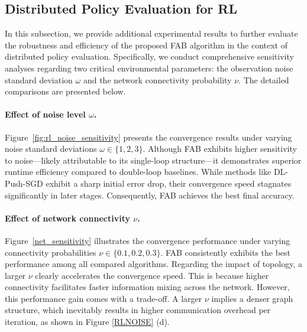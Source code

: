 \documentclass{article}
\theoremstyle{plain}
\theoremstyle{definition}
\theoremstyle{remark}
\begin{document}
\subsection{Distributed Policy Evaluation for RL} 
\label{app:extra_rl}
In this subsection, we provide additional experimental results to further evaluate the robustness and efficiency of the proposed FAB algorithm in the context of distributed policy evaluation. Specifically, we conduct comprehensive sensitivity analyses regarding two critical environmental parameters: the observation noise standard deviation $\omega$ and the network connectivity probability $\nu$. The detailed comparisons are presented below. 

\paragraph{Effect of noise level $\omega$.}
Figure~\ref{fig:rl_noise_sensitivity} presents the convergence results under varying noise standard deviations $\omega \in \{1, 2, 3\}$. 
Although FAB exhibits higher sensitivity to noise—likely attributable to its single-loop structure—it demonstrates superior runtime efficiency compared to double-loop baselines. 
While methods like DL-Push-SGD exhibit a sharp initial error drop, their convergence speed stagnates significantly in later stages. Consequently, FAB achieves the best final accuracy.

\paragraph{Effect of network connectivity $\nu$.}
Figure~\ref{net_sensitivity} illustrates the convergence performance under varying connectivity probabilities $\nu \in \{0.1, 0.2, 0.3\}$. 
FAB consistently exhibits the best performance among all compared algorithms. 
Regarding the impact of topology, a larger $\nu$ clearly accelerates the convergence speed. This is because higher connectivity facilitates faster information mixing across the network. 
However, this performance gain comes with a trade-off. A larger $\nu$ implies a denser graph structure, which inevitably results in higher communication overhead per iteration, as shown in Figure \ref{RLNOISE} (d).
\end{document}
